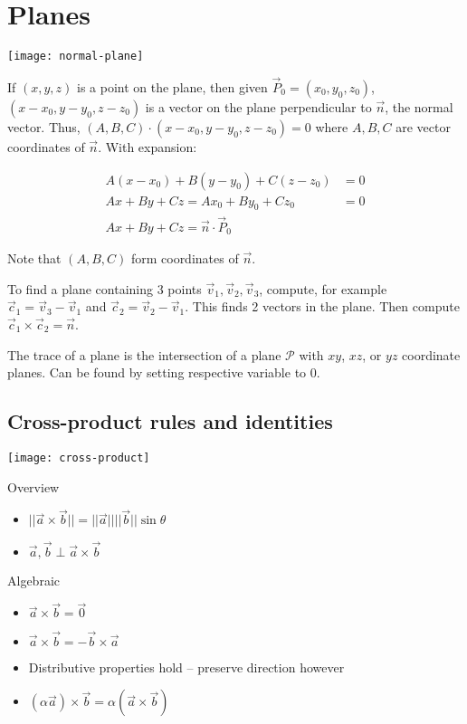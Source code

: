 \section{Planes}

\begin{center}
    \texttt{[image: normal-plane]}
\end{center}

If $(x,y,z)$ is a point on the plane, then given $\vec{P}_0=(x_0,y_0,z_0)$, $(x-x_0,y-y_0,z-z_0)$ is a vector on the plane perpendicular to $\vec{n}$, the
normal vector. Thus, $(A,B,C)\cdot(x-x_0,y-y_0,z-z_0)=0$ where $A,B,C$ are vector coordinates of $\vec{n}$. With expansion:

\begin{align*}
    A(x-x_0)+B(y-y_0)+C(z-z_0)&=0\\
    Ax+By+Cz=Ax_0+By_0+Cz_0&=0\\
    Ax+By+Cz=\vec{n}\cdot \vec{P}_0
\end{align*}

Note that $(A,B,C)$ form coordinates of $\vec{n}$.

To find a plane containing 3 points $\vec{v}_1,\vec{v}_2,\vec{v}_3$, compute, for example $\vec{c}_1=\vec{v}_3-\vec{v}_1$ and $\vec{c}_2=\vec{v}_2-\vec{v}_1$.
This finds 2 vectors in the plane. Then compute $\vec{c}_1\times \vec{c}_2=\vec{n}$. \newline

\noindent
The trace of a plane is the intersection of a plane $\mathcal{P}$ with $xy$, $xz$, or $yz$ coordinate planes. Can be found by setting respective variable to 0.

\subsection{Cross-product rules and identities}

\begin{center}
    \texttt{[image: cross-product]}
\end{center}

Overview
\begin{itemize}
    \item $||\vec{a}\times \vec{b}||=||\vec{a}||||\vec{b}||\sin\theta$
    \item $\vec{a},\vec{b}\perp \vec{a}\times \vec{b}$
\end{itemize}

Algebraic
\begin{itemize}
    \item $\vec{a}\times \vec{b}=\vec{0}$
    \item $\vec{a}\times \vec{b}=-\vec{b}\times \vec{a}$
    \item Distributive properties hold -- preserve direction however
    \item $(\alpha \vec{a})\times \vec{b}=\alpha(\vec{a}\times \vec{b})$
\end{itemize}

